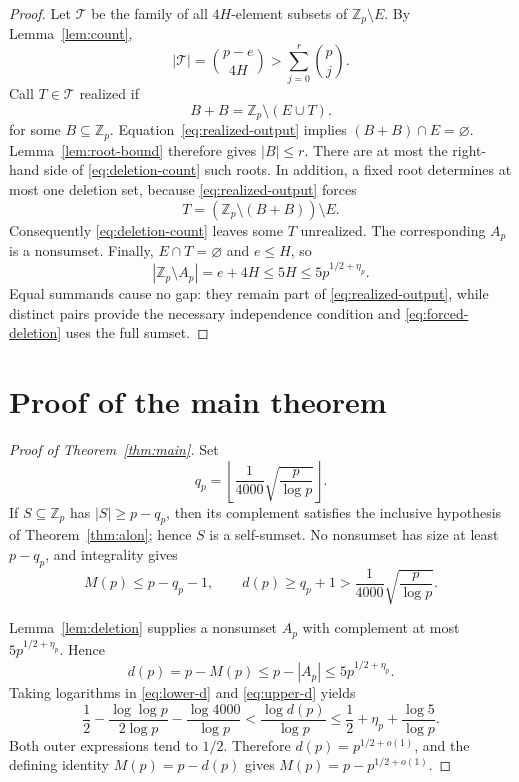 \documentclass[11pt]{article}
\theoremstyle{definition}
\newcommand{\Zp}{\mathbb Z_p}
\begin{document}
\begin{proof}
Let $\mathcal T$ be the family of all $4H$-element subsets of
$\Zp\setminus E$.  By Lemma~\ref{lem:count},
\[
 |\mathcal T|=\binom{p-e}{4H}>
 \sum_{j=0}^{r}\binom pj.                         \label{eq:deletion-count}
\]
Call $T\in\mathcal T$ realized if
\[
 B+B=\Zp\setminus(E\cup T).                       \label{eq:realized-output}
\]
for some $B\subseteq\Zp$.  Equation~\eqref{eq:realized-output} implies
$(B+B)\cap E=\varnothing$.  Lemma~\ref{lem:root-bound} therefore gives
$|B|\le r$.  There are at most the right-hand side of
\eqref{eq:deletion-count} such roots.  In addition, a fixed root determines
at most one deletion set, because \eqref{eq:realized-output} forces
\[
 T=(\Zp\setminus(B+B))\setminus E.                \label{eq:forced-deletion}
\]
Consequently \eqref{eq:deletion-count} leaves some $T$ unrealized.  The
corresponding $A_p$ is a nonsumset.  Finally, $E\cap T=\varnothing$ and
$e\le H$, so
\[
 |\Zp\setminus A_p|=e+4H\le5H\le5p^{1/2+\eta_p}.
\]
Equal summands cause no gap: they remain part of
\eqref{eq:realized-output}, while distinct pairs provide the necessary
independence condition and \eqref{eq:forced-deletion} uses the full sumset.
\end{proof}

\section{Proof of the main theorem}

\begin{proof}[Proof of Theorem~\ref{thm:main}]
Set
\[
 q_p=\left\lfloor\frac1{4000}\sqrt{\frac p{\log p}}\right\rfloor.
\]
If $S\subseteq\Zp$ has $|S|\ge p-q_p$, then its complement satisfies the
inclusive hypothesis of Theorem~\ref{thm:alon}; hence $S$ is a self-sumset.
No nonsumset has size at least $p-q_p$, and integrality gives
\[
 M(p)\le p-q_p-1,
 \qquad d(p)\ge q_p+1>\frac1{4000}\sqrt{\frac p{\log p}}.
                                                        \label{eq:lower-d}
\]

Lemma~\ref{lem:deletion} supplies a nonsumset $A_p$ with complement at most
$5p^{1/2+\eta_p}$.  Hence
\[
 d(p)=p-M(p)\le p-|A_p|\le5p^{1/2+\eta_p}.         \label{eq:upper-d}
\]
Taking logarithms in \eqref{eq:lower-d} and \eqref{eq:upper-d} yields
\[
 \frac12-\frac{\log\log p}{2\log p}-\frac{\log4000}{\log p}
 <\frac{\log d(p)}{\log p}
 \le\frac12+\eta_p+\frac{\log5}{\log p}.
\]
Both outer expressions tend to $1/2$.  Therefore
$d(p)=p^{1/2+o(1)}$, and the defining identity $M(p)=p-d(p)$ gives
$M(p)=p-p^{1/2+o(1)}$.
\end{proof}
\end{document}
